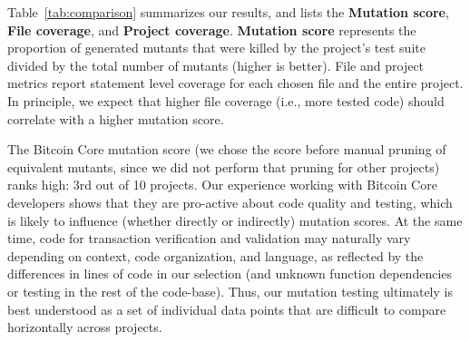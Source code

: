 Table~\ref{tab:comparison} summarizes our results, and lists the
\textbf{Mutation score}, \textbf{File coverage}, and \textbf{Project coverage}. \textbf{Mutation score} represents the proportion of
generated mutants that were killed by the project's test suite divided by the total number
of mutants (higher is better). File and project metrics report statement level coverage
for each chosen file and the entire project. In principle, we expect that higher file coverage
(i.e., more tested code) should correlate with a higher mutation
score.

The Bitcoin Core mutation score (we chose the score before manual
pruning of equivalent mutants, since we did not perform that pruning
for other projects) ranks high: 3rd out of 10 projects. Our experience
working with Bitcoin Core developers shows that they are pro-active about code
quality and testing, which is likely to influence (whether directly or
indirectly) mutation scores.  At the same time, code
for transaction verification and validation may naturally vary depending on
context, code organization, and language, as reflected by the differences in
lines of code in our selection (and unknown function dependencies or testing in
the rest of the code-base). Thus, our mutation testing
ultimately is best understood as a set of individual data points that are difficult to compare
horizontally across projects.
%



%
%

